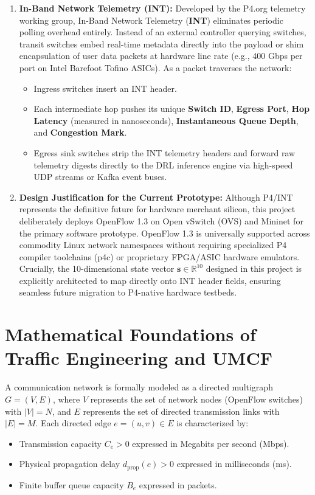 \documentclass[12pt,a4paper,oneside]{report}
\begin{document}
\begin{enumerate}
    \item \textbf{In-Band Network Telemetry (INT):}
    Developed by the P4.org telemetry working group, In-Band Network Telemetry (\textbf{INT}) eliminates periodic polling overhead entirely. Instead of an external controller querying switches, transit switches embed real-time metadata directly into the payload or shim encapsulation of user data packets at hardware line rate (e.g., 400 Gbps per port on Intel Barefoot Tofino ASICs). As a packet traverses the network:
    \begin{itemize}
        \item Ingress switches insert an INT header.
        \item Each intermediate hop pushes its unique \textbf{Switch ID}, \textbf{Egress Port}, \textbf{Hop Latency} (measured in nanoseconds), \textbf{Instantaneous Queue Depth}, and \textbf{Congestion Mark}.
        \item Egress sink switches strip the INT telemetry headers and forward raw telemetry digests directly to the DRL inference engine via high-speed UDP streams or Kafka event buses.
    \end{itemize}

    \item \textbf{Design Justification for the Current Prototype:}
    Although P4/INT represents the definitive future for hardware merchant silicon, this project deliberately deploys OpenFlow 1.3 on Open vSwitch (OVS) and Mininet for the primary software prototype. OpenFlow 1.3 is universally supported across commodity Linux network namespaces without requiring specialized P4 compiler toolchains (p4c) or proprietary FPGA/ASIC hardware emulators. Crucially, the 10-dimensional state vector $\mathbf{s} \in \mathbb{R}^{10}$ designed in this project is explicitly architected to map directly onto INT header fields, ensuring seamless future migration to P4-native hardware testbeds.
\end{enumerate}

\section{Mathematical Foundations of Traffic Engineering and UMCF}
A communication network is formally modeled as a directed multigraph $G = (V, E)$, where $V$ represents the set of network nodes (OpenFlow switches) with $|V| = N$, and $E$ represents the set of directed transmission links with $|E| = M$. Each directed edge $e = (u, v) \in E$ is characterized by:
\begin{itemize}
    \item Transmission capacity $C_e > 0$ expressed in Megabits per second (Mbps).
    \item Physical propagation delay $d_{\text{prop}}(e) > 0$ expressed in milliseconds (ms).
    \item Finite buffer queue capacity $B_e$ expressed in packets.
\end{itemize}
\end{document}
